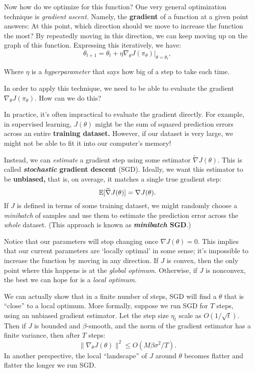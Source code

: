 \documentclass[\main/main]{subfiles}
\begin{document}
Now how do we optimize for this function?
One very general optimization technique is \emph{gradient ascent.} Namely, the \textbf{gradient} of a function at a given point answers: At this point, which direction should we move to increase the function the most? By repeatedly moving in this direction, we can keep moving up on the graph of this function. Expressing this iteratively, we have: \[
    \theta_{t+1} = \theta_t + \eta \nabla_\theta J(\pi_\theta) \Big|_{\theta = \theta_t},
\]

Where $\eta$ is a \emph{hyperparameter} that says how big of a step to take each time.

In order to apply this technique, we need to be able to evaluate the gradient $\nabla_\theta J(\pi_\theta).$ How can we do this?

In practice, it's often impractical to evaluate the gradient directly. For example, in supervised learning, $J(\theta)$ might be the sum of squared prediction errors across an entire \textbf{training dataset.} However, if our dataset is very large, we might not be able to fit it into our computer's memory!

Instead, we can \emph{estimate} a gradient step using some estimator $\tilde \nabla J(\theta).$ This is called \textbf{\emph{stochastic} gradient descent} (SGD). Ideally, we want this estimator to be \textbf{unbiased,} that is, on average, it matches a single true gradient step:
\[ \operatorname*{\mathbb{E}} [\widetilde \nabla J(\theta)] = \nabla J(\theta). \]
If $J$ is defined in terms of some training dataset, we might randomly choose a \emph{minibatch} of samples and use them to estimate the prediction error across the \emph{whole} dataset. (This approach is known as \textbf{\emph{minibatch} SGD}.)

Notice that our parameters will stop changing once $\nabla J(\theta) = 0.$ This implies that our current parameters are `locally optimal' in some sense; it's impossible to increase the function by moving in any direction. If $J$ is convex, then the only point where this happens is at the \emph{global optimum.} Otherwise, if $J$ is nonconvex, the best we can hope for is a \emph{local optimum.}

We can actually show that in a finite number of steps, SGD will find a $\theta$ that is ``close'' to a local optimum. More formally, suppose we run SGD for $T$ steps, using an unbiased gradient estimator. Let the step size $\eta_t$ scale as $O(1/ \sqrt{t}).$ Then if $J$ is bounded and $\beta$-smooth, and the norm of the gradient estimator has a finite variance, then after $T$ steps: \[
    \|\nabla_\theta J(\theta)\|^2 \le O \left( M \beta \sigma^2 / T\right).
\]
In another perspective, the local ``landscape'' of $J$ around $\theta$ becomes flatter and flatter the longer we run SGD.
\end{document}
